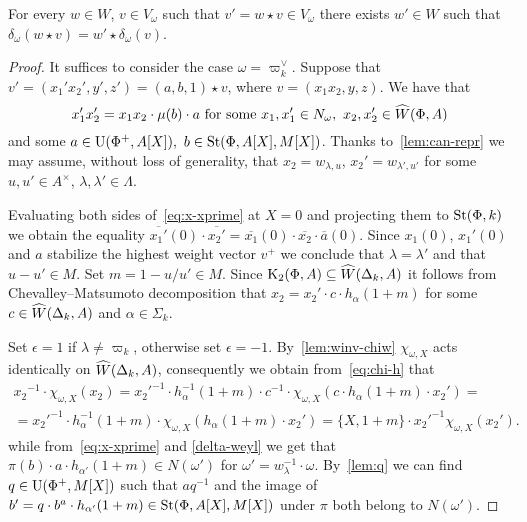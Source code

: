 \begin{prop}
 For every $w \in W$, $v \in V_\omega$ such that $v' = w \star v \in V_\omega$ there exists $w' \in W$ such that
  $\delta_\omega(w \star v) = w' \star \delta_\omega(v)$.
\end{prop}
\begin{proof}
 It suffices to consider the case $\omega = \varpi_k^\vee$.
 Suppose that $v' = (x_1' x_2', y', z') = (a, b, 1) \star v$, where $v = (x_1 x_2, y, z)$.
 We have that
 \begin{equation}\label{eq:x-xprime} x_1' x_2' = x_1 x_2 \cdot \mu(b) \cdot a  \text{ for some }x_1, x_1' \in N_\omega,\ x_2, x_2' \in \widehat{W}(\Phi, A) \end{equation}
 and some $a \in \operatorname{U}(\Phi^+, A[X]),\ b \in \operatorname{St}(\Phi, A[X], M[X])$.
 Thanks to~\cref{lem:can-repr} we may assume, without loss of generality, that $x_2 = w_{\lambda, u}$, $x_2' = w_{\lambda', u'}$
 for some $u, u' \in A^\times$, $\lambda, \lambda' \in \Lambda$.

 Evaluating both sides of~\eqref{eq:x-xprime} at $X=0$ and projecting them to $\operatorname{St}(\Phi, k)$ we obtain the equality
  $\overline{x_1'}(0) \cdot \overline{x_2'} = \overline{x_1}(0) \cdot \overline{x_2}\cdot \overline{a}(0).$
 Since $x_1(0)$, $x_1'(0)$ and $a$ stabilize the highest weight vector $v^+$ we conclude that $\lambda = \lambda'$ and that $u - u' \in M$.
 Set $m = 1 - u/u' \in M$.
 Since $\operatorname{K}_2(\Phi, A) \subseteq \widehat{W}(\Delta_k, A)$ it follows from Chevalley--Matsumoto decomposition that
  $x_2 = x_2' \cdot c \cdot h_{\alpha}(1 + m)$ for some $c \in \widehat{W}(\Delta_k, A)$ and $\alpha \in \Sigma_k$.

Set $\epsilon = 1$ if $\lambda\neq \varpi_k$, otherwise set $\epsilon = -1$.
 By~\cref{lem:winv-chiw} $\chi_{\omega, X}$ acts identically on $\widehat{W}(\Delta_k, A)$, consequently we obtain from~\eqref{eq:chi-h} that
\begin{multline*}\label{eq:central-term}
 {x_2}^{-1} \cdot \chi_{\omega, X}(x_2) =
    {x_2'}^{-1} \cdot h_{\alpha}^{-1}(1 + m) \cdot c^{-1} \cdot \chi_{\omega, X}(c \cdot h_{\alpha}(1 + m) \cdot x_2') = \\
    = {x_2'}^{-1} \cdot h_{\alpha}^{-1}(1 + m) \cdot \chi_{\omega, X}(h_{\alpha}(1 + m) \cdot x_2') = \{X, 1+m\} \cdot {x_2'}^{-1} \chi_{\omega, X}(x_2').
\end{multline*}
while from~\eqref{eq:x-xprime} and \cref{delta-weyl} we get that
$\pi(b) \cdot a \cdot h_{\alpha'}(1 + m) \in N(\omega')$ for $\omega' = w_\lambda^{-1} \cdot \omega$. By~\cref{lem:q} we can find $q \in \operatorname{U}(\Phi^+, M[X])$ such that $a q^{-1}$ and the image of $b' = q \cdot b^a \cdot h_{\alpha'}(1+m) \in \operatorname{St}(\Phi, A[X], M[X])$ under $\pi$ both belong to $N(\omega')$.



\end{proof}
